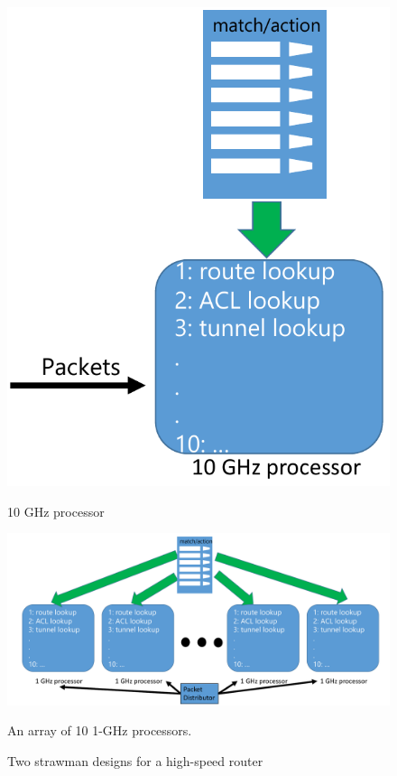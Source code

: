 \begin{figure}[!t]
\begin{minipage}{0.3\textwidth}
\centering
\includegraphics[width=\textwidth]{single_processor.pdf}
\caption{10 GHz processor}
\label{fig:single_processor}
\end{minipage}
\hfill
\begin{minipage}{0.7\textwidth}
\centering
\includegraphics[width=\textwidth]{processor_array.pdf}
\caption{An array of 10 1-GHz processors. }
\label{fig:processor_array}
\end{minipage}
\caption{Two strawman designs for a high-speed router}
\end{figure}


